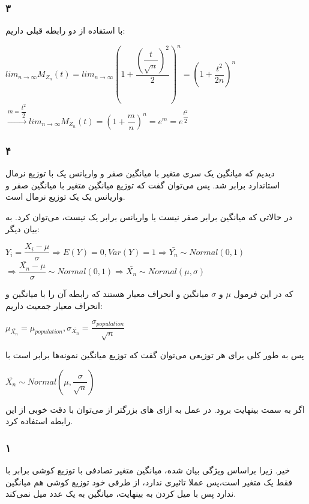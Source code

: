 \documentclass[12pt]{article}
\begin{document}
\begin{itemize}
\subsubsection{۳}
با استفاده از دو رابطه قبلی داریم:
\begin{latin}
	$
	lim_{n \rightarrow \infty} M_{Z_n}(t) = lim_{n \rightarrow \infty} (1 + \dfrac{(\dfrac{t}{\sqrt{n}})^2}{2} )^n = (1 + \dfrac{t^2}{2n})^n 
	$
	\\
	$
	\xrightarrow{m = \dfrac{t^2}{2}} lim_{n \rightarrow \infty} M_{Z_n}(t) = (1 + \dfrac{m}{n})^n
	= e^m = e^{\dfrac{t^2}{2}}
	$
\end{latin}
\subsubsection{۴}
دیدیم که 
میانگین یک سری متغیر 
با میانگین صفر  و واریانس یک با 
توزیع نرمال استاندارد برابر شد. پس می‌توان گفت که توزیع میانگین 
متغیر 
با میانگین صفر و واریانس یک یک توزیع نرمال است. 

در حالاتی که میانگین برابر صفر نیست یا واریانس برابر یک نیست، می‌توان 
کرد. به بیان دیگر:
\begin{latin}
	$
	Y_i = \dfrac{X_i - \mu}{\sigma} \Rightarrow E(Y) = 0, Var(Y) = 1 \Rightarrow \bar{Y_n} \sim Normal (0, 1) 
	$
	\\
	$
	\Rightarrow \dfrac{\bar{X_n} - \mu}{\sigma} \sim Normal(0, 1) \Rightarrow \bar{X_n} \sim Normal(\mu, \sigma)
	$
\end{latin}
که در این فرمول 
$\mu$
و
$\sigma$
میانگین و انحراف معیار 
هستند که رابطه آن را با میانگین و انحراف معیار جمعیت داریم:
\begin{latin}
	$
	\mu_{\bar{X_n}} = \mu_{population}, \sigma_{\bar{X_n}} = \dfrac{\sigma_{population}}{\sqrt{n}}
	$
\end{latin}
پس به طور کلی برای هر توزیعی می‌توان گفت که توزیع میانگین نمونه‌ها برابر است با 
\begin{latin}
	$
	\bar{X_n} \sim Normal(\mu, \dfrac{\sigma}{\sqrt{n}})
	$
\end{latin}
اگر 
به سمت بینهایت برود. در عمل به ازای 
های بزرگتر از 
می‌توان با دقت خوبی از این رابطه استفاده کرد.
\subsubsection{۱}
خیر. زیرا براساس ویژگی بیان شده، میانگین 
متغیر تصادفی با توزیع کوشی برابر با فقط یک متغیر است،‌پس عملا 
تاثیری ندارد، از طرفی خود توزیع کوشی هم میانگین ندارد پس با میل کردن 
به بینهایت، میانگین به یک عدد میل نمی‌کند.

\end{itemize}
\end{document}
